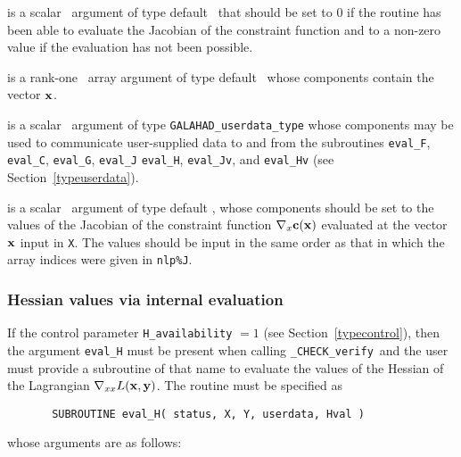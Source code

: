 \documentclass{galahad}
\newcommand{\packagename}{CHECK}
\newcommand{\fullpackagename}{\libraryname\_\packagename}
\newcommand{\solver}{{\tt \fullpackagename\_verify}}
\begin{document}
\begin{description}
 is a scalar \intentout\ argument of type default \integer\
that should be set to 0 if the routine has been able to evaluate
the Jacobian of the constraint function
and to a non-zero value if the evaluation has not been possible.

 is a rank-one \intentin\ array argument of type default \realdp\
whose components contain the vector ${\mathbf{x}}$.

 is a scalar \intentinout\ argument of type 
{\tt GALAHAD\_userdata\_type} whose components may be used
to communicate user-supplied data to and from the
subroutines {\tt eval\_F}, {\tt eval\_C}, {\tt eval\_G}, {\tt eval\_J}
{\tt eval\_H}, {\tt eval\_Jv}, and {\tt eval\_Hv} 
(see Section~\ref{typeuserdata}).

 is a scalar \intentout\ argument of type default \realdp,
whose components should be set to the values of the Jacobian
of the constraint function $\nabla_x {\mathbf{c}}({\mathbf{x}})$
evaluated at the vector ${\mathbf{x}}$ input in {\tt X}. The values should
be input in the same order as that in which the array indices were
given in {\tt nlp\%J}.

\end{description}


\subsubsection{Hessian values via internal evaluation\label{hfv}}

If the control parameter {\tt H\_availability} $=1$ (see
Section~\ref{typecontrol}), then the argument {\tt eval\_H} must be
present when calling \solver\ and the
user must provide a subroutine of that name to evaluate the
values of the Hessian of the Lagrangian $\nabla_{xx} L({\mathbf{x}},{\mathbf{y}})$.
The routine must be specified as

\def\baselinestretch{0.8}
{\tt \begin{verbatim}
       SUBROUTINE eval_H( status, X, Y, userdata, Hval ) \end{verbatim} }
\def\baselinestretch{1.0}
\noindent whose arguments are as follows:
\end{document}
